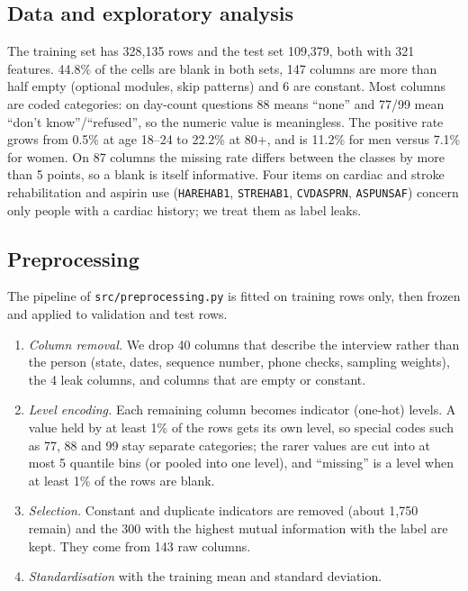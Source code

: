 \documentclass[10pt,conference,compsocconf]{IEEEtran}
\begin{document}
\subsection{Data and exploratory analysis}
The training set has 328{,}135 rows and the test set 109{,}379, both with 321
features. 44.8\% of the cells are blank in both sets, 147 columns are more than
half empty (optional modules, skip patterns) and 6 are constant.
Most columns are coded categories: on day-count questions 88 means ``none'' and
77/99 mean ``don't know''/``refused'', so the numeric value is meaningless.
The positive rate grows from 0.5\% at age 18--24 to 22.2\% at 80+, and is
11.2\% for men versus 7.1\% for women. On 87 columns the missing rate differs
between the classes by more than 5 points, so a blank is itself informative.
Four items on cardiac and stroke rehabilitation and aspirin use
(\texttt{HAREHAB1}, \texttt{STREHAB1}, \texttt{CVDASPRN}, \texttt{ASPUNSAF}) concern only
people with a cardiac history; we treat them as label leaks.

\subsection{Preprocessing}
The pipeline of \texttt{src/preprocessing.py} is fitted on training rows only,
then frozen and applied to validation and test rows.
\begin{enumerate}
\item \emph{Column removal.} We drop 40 columns that describe the interview
rather than the person (state, dates, sequence number, phone checks, sampling
weights), the 4 leak columns, and columns that are empty or constant.
\item \emph{Level encoding.} Each remaining column becomes indicator (one-hot)
levels. A value held by at least 1\% of the rows gets its own level, so special
codes such as 77, 88 and 99 stay separate categories; the rarer values are cut
into at most 5 quantile bins (or pooled into one level), and ``missing'' is a
level when at least 1\% of the rows are blank.
\item \emph{Selection.} Constant and duplicate indicators are removed (about
1{,}750 remain) and the 300 with the highest mutual information with the label
are kept. They come from 143 raw columns.
\item \emph{Standardisation} with the training mean and standard deviation.
\end{enumerate}
\end{document}
